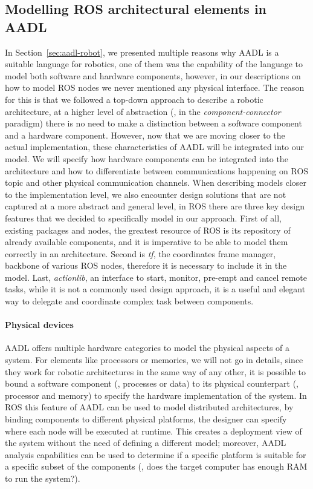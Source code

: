 \subsection{Modelling ROS architectural elements in AADL}
\label{sec:ros-arch}
In Section~\ref{sec:aadl-robot}, we presented multiple reasons why AADL is a suitable language for robotics, one of them was the capability of the language to model both software and hardware components, however, in our descriptions on how to model ROS nodes we never mentioned any physical interface. The reason for this is that we followed a top-down approach to describe a robotic architecture, at a higher level of abstraction (\ie, in the \textit{component-connector} paradigm) there is no need to make a distinction between a software component and a hardware component. However, now that we are moving closer to the actual implementation, these characteristics of AADL will be integrated into our model. We will specify how hardware components can be integrated into the architecture and how to differentiate between communications happening on ROS topic and other physical communication channels. When describing models closer to the implementation level, we also encounter design solutions that are not captured at a more abstract and general level, in ROS there are three key design features that we decided to specifically model in our approach. First of all, existing packages and nodes, the greatest resource of ROS is its repository of already available components, and it is imperative to be able to model them correctly in an architecture. Second is \textit{tf}, the coordinates frame manager, backbone of various ROS nodes, therefore it is necessary to include it in the model. Last, \textit{actionlib}, an interface to start, monitor, pre-empt and cancel remote tasks, while it is not a commonly used design approach, it is a useful and elegant way to delegate and coordinate complex task between components.

\paragraph{Physical devices} AADL offers multiple hardware categories to model the physical aspects of a system. For elements like processors or memories, we will not go in details, since they work for robotic architectures in the same way of any other, it is possible to bound a software component (\eg, processes or data) to its physical counterpart (\eg, processor and memory) to specify the hardware implementation of the system. In ROS this feature of AADL can be used to model distributed architectures, by binding components to different physical platforms, the designer can specify where each node will be executed at runtime. This creates a deployment view of the system without the need of defining a different model; moreover, AADL analysis capabilities can be used to determine if a specific platform is suitable for a specific subset of the components (\eg, does the target computer has enough RAM to run the system?).

